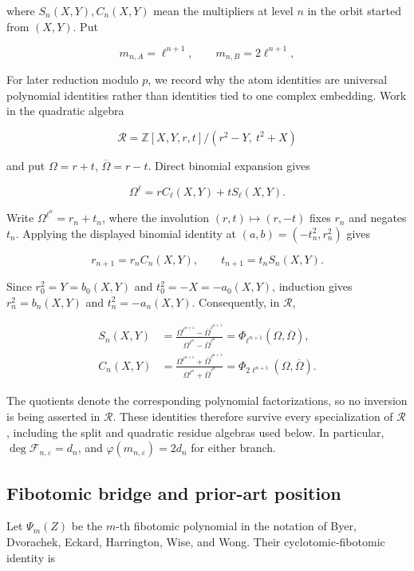 \documentclass[11pt]{article}
\begin{document}
where \(S_n(X,Y),C_n(X,Y)\) mean the multipliers at level \(n\) in the
orbit started from \((X,Y)\). Put

\[
m_{n,A}
=
\ell^{n+1},
\qquad
m_{n,B}
=
2\ell^{n+1},
\]

For later reduction modulo \(p\), we record why the atom identities are
universal polynomial identities rather than identities tied to one
complex embedding. Work in the quadratic algebra

\[
\mathcal R
=
\mathbb Z[X,Y,r,t]/(r^2-Y,\ t^2+X)
\]

and put \(\Omega=r+t\), \(\overline\Omega=r-t\). Direct binomial
expansion gives

\[
\Omega^\ell
=
rC_\ell(X,Y)+tS_\ell(X,Y).
\]

Write
\(\Omega^{\ell^n}=r_n+t_n\), where the involution
\((r,t)\mapsto(r,-t)\) fixes \(r_n\) and negates \(t_n\). Applying the
displayed binomial identity at \((a,b)=(-t_n^2,r_n^2)\) gives

\[
r_{n+1}=r_nC_n(X,Y),
\qquad
t_{n+1}=t_nS_n(X,Y).
\]

Since \(r_0^2=Y=b_0(X,Y)\) and
\(t_0^2=-X=-a_0(X,Y)\), induction gives
\(r_n^2=b_n(X,Y)\) and \(t_n^2=-a_n(X,Y)\).
Consequently, in \(\mathcal R\),

\[
\begin{aligned}
S_n(X,Y)
&=
\frac{
\Omega^{\ell^{n+1}}-\overline\Omega^{\ell^{n+1}}
}{
\Omega^{\ell^n}-\overline\Omega^{\ell^n}
}
=
\Phi_{\ell^{n+1}}(\Omega,\overline\Omega),\\
C_n(X,Y)
&=
\frac{
\Omega^{\ell^{n+1}}+\overline\Omega^{\ell^{n+1}}
}{
\Omega^{\ell^n}+\overline\Omega^{\ell^n}
}
=
\Phi_{2\ell^{n+1}}(\Omega,\overline\Omega).
\end{aligned}
\]

The quotients denote the corresponding polynomial factorizations, so no
inversion is being asserted in \(\mathcal R\). These identities therefore
survive every specialization of \(\mathcal R\), including the split and
quadratic residue algebras used below. In particular,
\(\deg\mathcal F_{n,\varepsilon}=d_n\), and
\(\varphi(m_{n,\varepsilon})=2d_n\) for either branch.

\subsection{Fibotomic bridge and prior-art position}

Let \(\Psi_m(Z)\) be the \(m\)-th fibotomic polynomial in the notation of
Byer, Dvorachek, Eckard, Harrington, Wise, and Wong. Their
cyclotomic-fibotomic identity is
\end{document}
